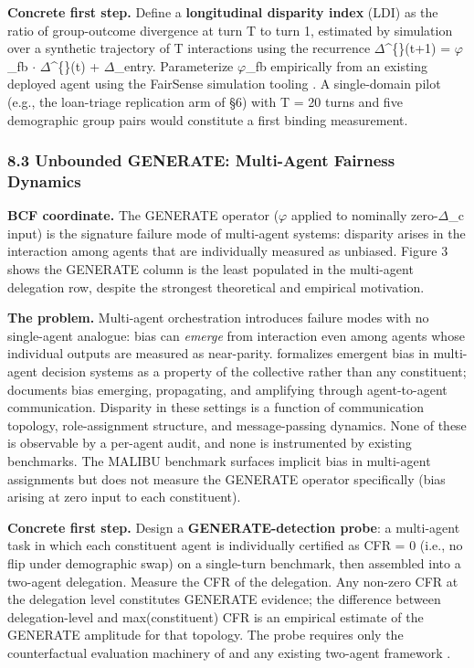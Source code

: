 \documentclass[10pt]{article}
\begin{document}
\textbf{Concrete first step.} Define a \textbf{longitudinal disparity index} (LDI) as the ratio of group-outcome divergence at turn T to turn 1, estimated by simulation over a synthetic trajectory of T interactions using the recurrence $\Delta$\textasciicircum\{\}(t+1) = $\varphi$\_fb $\cdot$ $\Delta$\textasciicircum\{\}(t) + $\Delta$\_entry. Parameterize $\varphi$\_fb empirically from an existing deployed agent using the FairSense simulation tooling \cite{she2025fairsense}. A single-domain pilot (e.g., the loan-triage replication arm of \S{}6) with T = 20 turns and five demographic group pairs would constitute a first binding measurement.

\subsubsection*{8.3 Unbounded GENERATE: Multi-Agent Fairness Dynamics}

\textbf{BCF coordinate.} The GENERATE operator ($\varphi$ applied to nominally zero-$\Delta$\_c input) is the signature failure mode of multi-agent systems: disparity arises in the interaction among agents that are individually measured as unbiased. Figure 3 shows the GENERATE column is the least populated in the multi-agent delegation row, despite the strongest theoretical and empirical motivation.

\textbf{The problem.} Multi-agent orchestration introduces failure modes with no single-agent analogue: bias can \emph{emerge} from interaction even among agents whose individual outputs are measured as near-parity. \cite{madigan2025emergent} formalizes emergent bias in multi-agent decision systems as a property of the collective rather than any constituent; \cite{nguyen2025social} documents bias emerging, propagating, and amplifying through agent-to-agent communication. Disparity in these settings is a function of communication topology, role-assignment structure, and message-passing dynamics. None of these is observable by a per-agent audit, and none is instrumented by existing benchmarks. The MALIBU benchmark \cite{mirza2025malibu} surfaces implicit bias in multi-agent assignments but does not measure the GENERATE operator specifically (bias arising at zero input to each constituent).

\textbf{Concrete first step.} Design a \textbf{GENERATE-detection probe}: a multi-agent task in which each constituent agent is individually certified as CFR = 0 (i.e., no flip under demographic swap) on a single-turn benchmark, then assembled into a two-agent delegation. Measure the CFR of the delegation. Any non-zero CFR at the delegation level constitutes GENERATE evidence; the difference between delegation-level and max(constituent) CFR is an empirical estimate of the GENERATE amplitude for that topology. The probe requires only the counterfactual evaluation machinery of \cite{mayilvaghanan2026counterfactual} and any existing two-agent framework \cite{wu2023autogen}.
\end{document}
